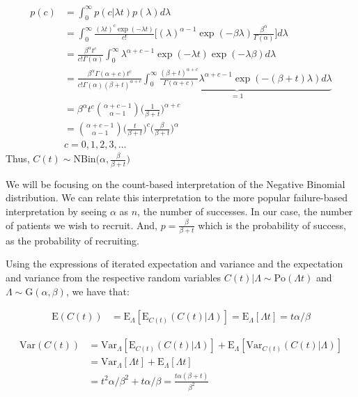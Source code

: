 \begin{align*}
p(c)&=\int^\infty_0 p(c|\lambda t) p(\lambda) d\lambda\\
&=\int^\infty_0 \frac{(\lambda t)^c\exp(-\lambda t)}{c!}\Bigg[(\lambda)^{\alpha-1}\exp(-\beta\lambda )\frac{\beta^\alpha}{\Gamma(\alpha)}\Bigg]d\lambda\\
&=\frac{\beta^\alpha t^c}{c!\Gamma(\alpha)}\int^\infty_0 \lambda^{\alpha+c-1}\exp(-\lambda t)\exp(-\lambda\beta)d\lambda\\
&=\frac{\beta^\alpha\Gamma(\alpha+c) t^c}{c!\Gamma(\alpha) (\beta+t)^{\alpha+c}}\underbrace{\int^\infty_0 \frac{(\beta+t)^{\alpha+c}}{\Gamma(\alpha+c)} \lambda^{\alpha+c-1}\exp(-(\beta+t)\lambda)d\lambda}_{=1}\\
&=\beta^\alpha t^c\binom{\alpha+c-1}{\alpha-1}\Bigg (\frac{1}{\beta+t}\Bigg)^{\alpha+c}\\
&=\binom{\alpha+c-1}{\alpha-1}\Bigg (\frac{t}{\beta+t}\Bigg)^{c} \Bigg(\frac{\beta}{\beta+t}\Bigg)^{\alpha}\\
& c = 0,1,2,3,\ldots
\end{align*}
Thus, $C(t)\sim \textrm{NBin} \Bigg(\alpha, \frac{\beta}{\beta+t}\Bigg)$

We will be focusing on the count-based interpretation of the Negative Binomial distribution. We can relate this interpretation to the more popular failure-based interpretation by seeing $\alpha$ as $n$, the number of successes. In our case, the number of patients we wish to recruit. And, $p = \frac{\beta}{\beta+t}$ which is the probability of success, as the probability of recruiting.


Using the expressions of iterated expectation and variance \citep{held2014applied} and the expectation and variance from the respective random variables $C(t)|\Lambda \sim \textrm{Po}(\Lambda t)$ and $\Lambda \sim \textrm{G}(\alpha,\beta)$, we have that:


\begin{align*}
\textrm{E}(C(t)) &= \textrm{E}_{\Lambda}[\textrm{E}_{C(t)} (C(t)|\Lambda)] = \textrm{E}_{\Lambda}[\Lambda t] = t\alpha/\beta
\end{align*}

\begin{align*}
\textrm{Var}(C(t)) &= \textrm{Var}_{\Lambda}[\textrm{E}_{C(t)} (C(t)|\Lambda)] + \textrm{E}_{\Lambda}[\textrm{Var}_{C(t)}(C(t)|\Lambda)]\\
&=\textrm{Var}_{\Lambda}[\Lambda t] + \textrm{E}_{\Lambda}[\Lambda t] \\
&=t^2\alpha/\beta^2 + t\alpha/\beta = \frac{t\alpha(\beta+t)}{\beta^2}
\end{align*}

